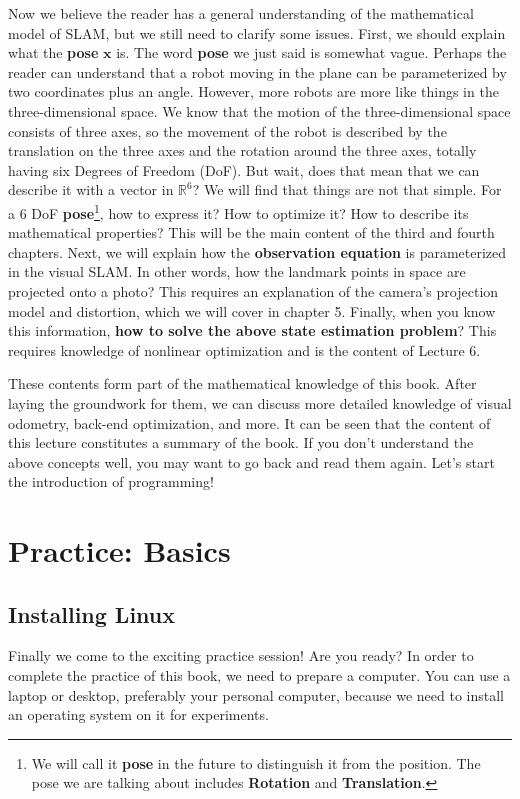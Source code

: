 Now we believe the reader has a general understanding of the mathematical model of SLAM, but we still need to clarify some issues. First, we should explain what the \textbf{pose} $\bm{x}$ is. The word \textbf{pose} we just said is somewhat vague. Perhaps the reader can understand that a robot moving in the plane can be parameterized by two coordinates plus an angle. However, more robots are more like things in the three-dimensional space. We know that the motion of the three-dimensional space consists of three axes, so the movement of the robot is described by the translation on the three axes and the rotation around the three axes, totally having six Degrees of Freedom (DoF). But wait, does that mean that we can describe it with a vector in $\mathbb{R}^6$? We will find that things are not that simple. For a 6 DoF \textbf{pose}\footnote{We will call it \textbf{pose} in the future to distinguish it from the position. The pose we are talking about includes \textbf{Rotation} and \textbf{Translation}. }, how to express it? How to optimize it? How to describe its mathematical properties?  This will be the main content of the third and fourth chapters. Next, we will explain how the \textbf{observation equation} is parameterized in the visual SLAM. In other words, how the landmark points in space are projected onto a photo? This requires an explanation of the camera's projection model and distortion, which we will cover in chapter 5. Finally, when you know this information, \textbf{how to solve the above state estimation problem}? This requires knowledge of nonlinear optimization and is the content of Lecture 6.
    
These contents form part of the mathematical knowledge of this book. After laying the groundwork for them, we can discuss more detailed knowledge of visual odometry, back-end optimization, and more. It can be seen that the content of this lecture constitutes a summary of the book. If you don't understand the above concepts well, you may want to go back and read them again. Let's start the introduction of  programming!


\section{Practice: Basics}
\subsection{Installing Linux}
Finally we come to the exciting practice session! Are you ready? In order to complete the practice of this book, we need to prepare a computer. You can use a laptop or desktop, preferably your personal computer, because we need to install an operating system on it for experiments.

